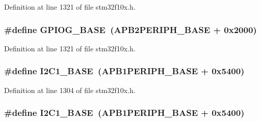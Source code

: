 Definition at line 1321 of file stm32f10x.\+h.

\subsubsection[{\texorpdfstring{G\+P\+I\+O\+G\+\_\+\+B\+A\+SE}{GPIOG_BASE}}]{\setlength{\rightskip}{0pt plus 5cm}\#define G\+P\+I\+O\+G\+\_\+\+B\+A\+SE~({\bf A\+P\+B2\+P\+E\+R\+I\+P\+H\+\_\+\+B\+A\+SE} + 0x2000)}\hypertarget{group___peripheral__memory__map_ga5d8ca4020f2e8c00bde974e8e7c13cfe}{}\label{group___peripheral__memory__map_ga5d8ca4020f2e8c00bde974e8e7c13cfe}


Definition at line 1321 of file stm32f10x.\+h.

\subsubsection[{\texorpdfstring{I2\+C1\+\_\+\+B\+A\+SE}{I2C1_BASE}}]{\setlength{\rightskip}{0pt plus 5cm}\#define I2\+C1\+\_\+\+B\+A\+SE~({\bf A\+P\+B1\+P\+E\+R\+I\+P\+H\+\_\+\+B\+A\+SE} + 0x5400)}\hypertarget{group___peripheral__memory__map_gacd72dbffb1738ca87c838545c4eb85a3}{}\label{group___peripheral__memory__map_gacd72dbffb1738ca87c838545c4eb85a3}


Definition at line 1304 of file stm32f10x.\+h.

\subsubsection[{\texorpdfstring{I2\+C1\+\_\+\+B\+A\+SE}{I2C1_BASE}}]{\setlength{\rightskip}{0pt plus 5cm}\#define I2\+C1\+\_\+\+B\+A\+SE~({\bf A\+P\+B1\+P\+E\+R\+I\+P\+H\+\_\+\+B\+A\+SE} + 0x5400)}\hypertarget{group___peripheral__memory__map_gacd72dbffb1738ca87c838545c4eb85a3}{}\label{group___peripheral__memory__map_gacd72dbffb1738ca87c838545c4eb85a3}


